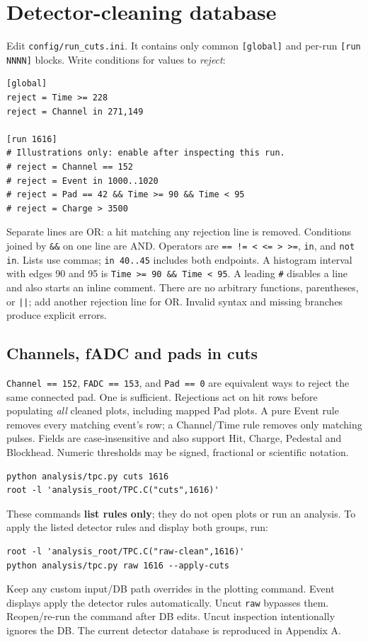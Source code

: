 \documentclass[11pt,a4paper]{article}
\begin{document}
\section{Detector-cleaning database}
Edit \texttt{config/run\_cuts.ini}. It contains only common \texttt{[global]} and
per-run \texttt{[run NNNN]} blocks. Write conditions for values to \emph{reject}:
\begin{lstlisting}
[global]
reject = Time >= 228
reject = Channel in 271,149

[run 1616]
# Illustrations only: enable after inspecting this run.
# reject = Channel == 152
# reject = Event in 1000..1020
# reject = Pad == 42 && Time >= 90 && Time < 95
# reject = Charge > 3500
\end{lstlisting}
Separate lines are OR: a hit matching any rejection line is removed. Conditions
joined by \texttt{\&\&} on one line are AND. Operators are
\texttt{== != < <= > >=}, \texttt{in}, and \texttt{not in}.
Lists use commas; \texttt{in 40..45} includes both endpoints. A histogram interval
with edges 90 and 95 is \texttt{Time >= 90 \&\& Time < 95}.
A leading \texttt{\#} disables a line and also starts an inline comment.
There are no arbitrary functions, parentheses, or \texttt{||}; add another rejection
line for OR. Invalid syntax and missing branches produce explicit errors.

\subsection{Channels, fADC and pads in cuts}
\texttt{Channel == 152}, \texttt{FADC == 153}, and \texttt{Pad == 0} are equivalent
ways to reject the same connected pad. One is sufficient. Rejections act on hit rows
before populating \emph{all} cleaned plots, including mapped Pad plots. A pure Event
rule removes every matching event's row; a Channel/Time rule removes only matching
pulses. Fields are case-insensitive and also support Hit, Charge, Pedestal and
Blockhead. Numeric thresholds may be signed, fractional or scientific notation.
\begin{lstlisting}
python analysis/tpc.py cuts 1616
root -l 'analysis_root/TPC.C("cuts",1616)'
\end{lstlisting}
These commands \textbf{list rules only}; they do not open plots or run an analysis.
To apply the listed detector rules and display both groups, run:
\begin{lstlisting}
root -l 'analysis_root/TPC.C("raw-clean",1616)'
python analysis/tpc.py raw 1616 --apply-cuts
\end{lstlisting}
Keep any custom input/DB path overrides in the plotting command. Event displays
apply the detector rules automatically. Uncut \texttt{raw} bypasses them.
Reopen/re-run the command after DB edits. Uncut inspection intentionally ignores the
DB. The current detector database is reproduced in Appendix A.
\end{document}
